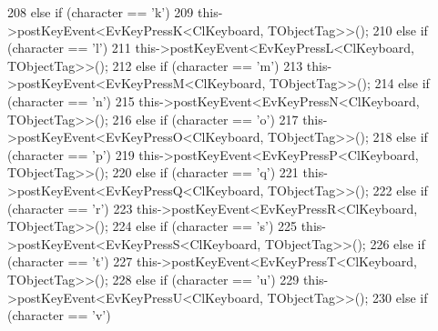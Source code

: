 \begin{DoxyCode}
{208                         \textcolor{keywordflow}{else} \textcolor{keywordflow}{if} (character == \textcolor{charliteral}{'k'})
209                                 this->postKeyEvent<EvKeyPressK<ClKeyboard, TObjectTag>>();
210                         \textcolor{keywordflow}{else} \textcolor{keywordflow}{if} (character == \textcolor{charliteral}{'l'})
211                                 this->postKeyEvent<EvKeyPressL<ClKeyboard, TObjectTag>>();
212                         \textcolor{keywordflow}{else} \textcolor{keywordflow}{if} (character == \textcolor{charliteral}{'m'})
213                                 this->postKeyEvent<EvKeyPressM<ClKeyboard, TObjectTag>>();
214                         \textcolor{keywordflow}{else} \textcolor{keywordflow}{if} (character == \textcolor{charliteral}{'n'})
215                                 this->postKeyEvent<EvKeyPressN<ClKeyboard, TObjectTag>>();
216                         \textcolor{keywordflow}{else} \textcolor{keywordflow}{if} (character == \textcolor{charliteral}{'o'})
217                                 this->postKeyEvent<EvKeyPressO<ClKeyboard, TObjectTag>>();
218                         \textcolor{keywordflow}{else} \textcolor{keywordflow}{if} (character == \textcolor{charliteral}{'p'})
219                                 this->postKeyEvent<EvKeyPressP<ClKeyboard, TObjectTag>>();
220                         \textcolor{keywordflow}{else} \textcolor{keywordflow}{if} (character == \textcolor{charliteral}{'q'})
221                                 this->postKeyEvent<EvKeyPressQ<ClKeyboard, TObjectTag>>();
222                         \textcolor{keywordflow}{else} \textcolor{keywordflow}{if} (character == \textcolor{charliteral}{'r'})
223                                 this->postKeyEvent<EvKeyPressR<ClKeyboard, TObjectTag>>();
224                         \textcolor{keywordflow}{else} \textcolor{keywordflow}{if} (character == \textcolor{charliteral}{'s'})
225                                 this->postKeyEvent<EvKeyPressS<ClKeyboard, TObjectTag>>();
226                         \textcolor{keywordflow}{else} \textcolor{keywordflow}{if} (character == \textcolor{charliteral}{'t'})
227                                 this->postKeyEvent<EvKeyPressT<ClKeyboard, TObjectTag>>();
228                         \textcolor{keywordflow}{else} \textcolor{keywordflow}{if} (character == \textcolor{charliteral}{'u'})
229                                 this->postKeyEvent<EvKeyPressU<ClKeyboard, TObjectTag>>();
230                         \textcolor{keywordflow}{else} \textcolor{keywordflow}{if} (character == \textcolor{charliteral}{'v'})
}
\end{DoxyCode}
